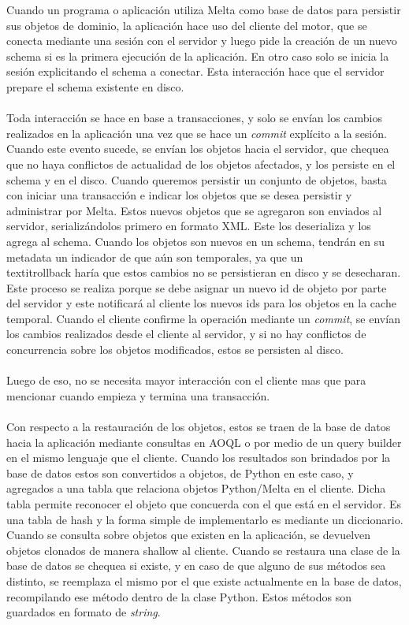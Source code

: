 \documentclass{melta}
\begin{document}
Cuando un programa o aplicación utiliza Melta como base de datos para persistir sus objetos de dominio, la aplicación hace uso del cliente del motor, que se conecta mediante una sesión con el servidor y luego pide la creación de un nuevo schema si es la primera ejecución de la aplicación. En otro caso solo se inicia la sesión explicitando el schema a conectar. Esta interacción hace que el servidor prepare el schema existente en disco.
\\\\
Toda interacción se hace en base a transacciones, y solo se envían los cambios realizados en la aplicación una vez que se hace un \textit{commit} explícito a la sesión. Cuando este evento sucede, se envían los objetos hacia el servidor, que chequea que no haya conflictos de actualidad de los objetos afectados, y los persiste en el schema y en el disco. 
Cuando queremos persistir un conjunto de objetos, basta con iniciar una transacción e indicar los objetos que se desea persistir y administrar por Melta. Estos nuevos objetos que se agregaron son enviados al servidor, serializándolos primero en formato XML. Este los deserializa y los agrega al schema. Cuando los objetos son nuevos en un schema, tendrán en su metadata un indicador de que aún son temporales, ya que un \\textit{rollback} haría que estos cambios no se persistieran en disco y se desecharan. Este proceso se realiza porque se debe asignar un nuevo id de objeto por parte del servidor y este notificará al cliente los nuevos ids para los objetos en la cache temporal. Cuando el cliente confirme la operación mediante un \textit{commit}, se envían los cambios realizados desde el cliente al servidor, y si no hay conflictos de concurrencia sobre los objetos modificados, estos se persisten al disco. 
\\\\
Luego de eso, no se necesita mayor interacción con el cliente mas que para mencionar cuando empieza y termina una transacción. 
\\\\
Con respecto a la restauración de los objetos, estos se traen de la base de datos hacia la aplicación mediante consultas en AOQL o por medio de un query builder en el mismo lenguaje que el cliente. Cuando los resultados son brindados por la base de datos estos son convertidos a objetos, de Python en este caso, y agregados a una tabla que relaciona objetos Python/Melta en el cliente. Dicha tabla permite reconocer el objeto que concuerda con el que está en el servidor. Es una tabla de hash y la forma simple de implementarlo es mediante un diccionario. Cuando se consulta sobre objetos que existen en la aplicación, se devuelven objetos clonados de manera shallow al cliente. Cuando se restaura una clase de la base de datos se chequea si existe, y en caso de que alguno de sus métodos sea distinto, se reemplaza el mismo por el que existe actualmente en la base de datos, recompilando ese método dentro de la clase Python. Estos métodos son guardados en formato de \textit{string}. 
\end{document}
